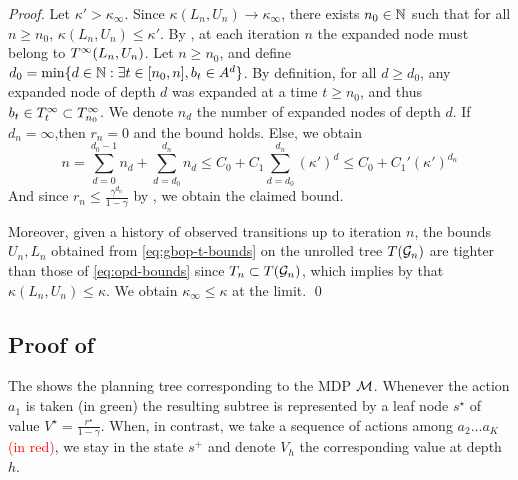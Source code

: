 \documentclass[runningheads]{llncs}
\begin{document}
\begin{proof}
Let $\kappa'>\kappa_\infty$. Since $\kappa(L_n,U_n)\rightarrow\kappa_\infty$, there exists $n_0\in\mathbb{N}$ such that for all $n\geq n_0$, $\kappa(L_n,U_n) \leq \kappa'$.
By , at each iteration $n$ the expanded node must belong to $T^\infty(L_n,U_n)$.
Let $n\geq n_0$, and define $d_0 = \min\{d\in\mathbb{N}: \exists t \in[n_0,n], b_t\in A^d \}$. By definition, for all $d\geq d_0$, any expanded node of depth $d$ was expanded at a time $t\geq n_0$, and thus $b_t\in T^\infty_t \subset T^\infty_{n_0}$. We denote $n_d$ the number of expanded nodes of depth $d$. If $d_n=\infty$,then $r_n = 0$ and the bound holds. Else, we obtain
\[
n = \sum_{d=0}^{d_0-1}n_d + \sum_{d=d_0}^{d_n} n_d \leq  C_0 + C_1\sum_{d=d_0}^{d_n} (\kappa')^d \leq C_0 + C_1' (\kappa')^{d_n}
\]
And since $r_n \leq \frac{\gamma^{d_n}}{1-\gamma}$ by , we obtain the claimed bound.

Moreover, given a history of observed transitions up to iteration $n$, the bounds $U_n, L_n$ obtained from \eqref{eq:gbop-t-bounds} on the unrolled tree $T(\mathcal{G}_n)$ are tighter than those of \eqref{eq:opd-bounds} since $T_n\subset T(\mathcal{G}_n)$, which implies by  that $\kappa(L_n, U_n) \leq \kappa$. We obtain $\kappa_\infty \leq \kappa$ at the limit. 
\qed\end{proof}

\subsection{Proof of }

The  shows the planning tree corresponding to the MDP $\mathcal{M}$. Whenever the action $a_1$ is taken \textcolor{OliveGreen}{(in green)} the resulting subtree is represented by a leaf node $s^\star$ of value $V^\star = \frac{r^\star}{1-\gamma}$. When, in contrast, we take a sequence of actions among $a_2\dots a_K$ \textcolor{red}{(in red)}, we stay in the state $s^+$ and denote $V_h$ the corresponding value at depth $h$.
\end{document}
